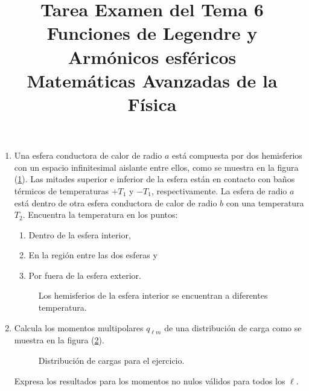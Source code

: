 
\author{}
\title{Tarea Examen del Tema 6  \\ \large{Funciones de Legendre y Armónicos esféricos\\ Matemáticas Avanzadas de la Física}} \vspace{-1.5\baselineskip}
\date{ }

\vspace{-4cm}
\renewcommand\labelenumii{\theenumi.{\arabic{enumii})}}
\maketitle
\fontsize{14}{14}\selectfont
\begin{enumerate}
\item Una esfera conductora de calor de radio $a$ está compuesta por dos hemisferios con un espacio infinitesimal aislante entre ellos, como se muestra en la figura (\ref{fig:figura2}). Las mitades superior e inferior de la esfera están en contacto con baños térmicos de temperaturas $+ T_{1}$ y $-T_{1}$, respectivamente. La esfera de radio $a$ está dentro de otra esfera conductora de calor de radio $b$ con una temperatura $T_{2}$. Encuentra la temperatura en los puntos:
\begin{enumerate}
\item Dentro de la esfera interior,
\item En la región entre las dos esferas y
\item Por fuera de la esfera exterior.
\end{enumerate} 
\begin{figure}[!ht]
    \centering
    
    \caption{Los hemisferios de la esfera interior se encuentran a diferentes temperatura.}
    \label{fig:figura2}
\end{figure}
\item Calcula los momentos multipolares $q_{\ell m}$ de una distribución de carga como se muestra en la figura (\ref{fig:figura_multipolo_01}).
\begin{figure}[!ht]
    \centering
    
    \caption{Distribución de cargas para el ejercicio.}
    \label{fig:figura_multipolo_01}
\end{figure}
Expresa los resultados para los momentos no nulos válidos para todos los $\ell$.
\par

\end{enumerate}
